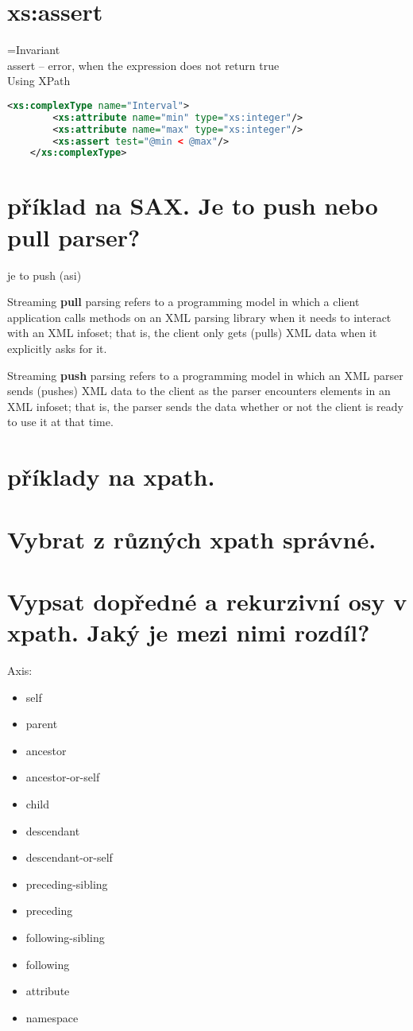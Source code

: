 \documentclass[a4paper,titlepage]{article}
\begin{document}
	
\section{ }
\section{xs:assert }
	=Invariant\\
	assert – error, when the expression does not return true\\
	Using XPath\\
	\begin{lstlisting}[language=XML]
	<xs:complexType name="Interval">
 		<xs:attribute name="min" type="xs:integer"/>
 		<xs:attribute name="max" type="xs:integer"/>
 		<xs:assert test="@min < @max"/>
	</xs:complexType>
	\end{lstlisting}
	
\section{příklad na SAX. Je to push nebo pull parser? }
	je to push (asi)
	
	Streaming \textbf{pull} parsing refers to a programming model in which a client application calls methods on an XML parsing library when it needs to interact with an XML infoset; that is, the client only gets (pulls) XML data when it explicitly asks for it.
	
	Streaming \textbf{push} parsing refers to a programming model in which an XML parser sends (pushes) XML data to the client as the parser encounters elements in an XML infoset; that is, the parser sends the data whether or not the client is ready to use it at that time.
	
\section{příklady na xpath. }
\section{Vybrat z různých xpath správné.}
\section{Vypsat dopředné a rekurzivní osy v xpath. Jaký je mezi nimi rozdíl? }
	Axis:
	\begin{itemize}
		\item self
		\item parent
		\item ancestor
		\item ancestor-or-self
		\item child
		\item descendant
		\item descendant-or-self
		\item preceding-sibling
		\item preceding
		\item following-sibling
		\item following
		\item attribute
		\item namespace
	\end{itemize}
	
\end{document}
